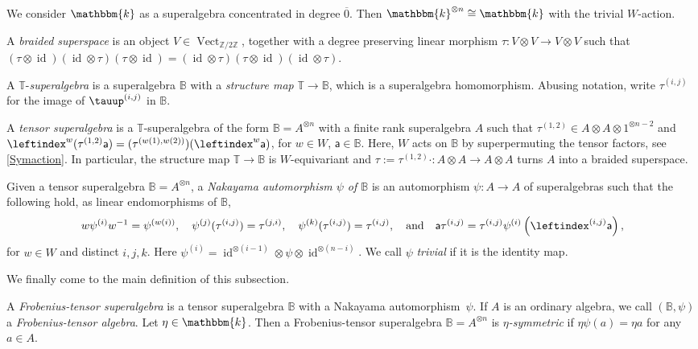 \documentclass[a4paper,11pt]{amsart}
\let\ov\overline
\numberwithin{equation}{subsection}
\theoremstyle{definition}
\theoremstyle{theorem}
\theoremstyle{remark}
\newcommand\Sym{W}
\newcommand\Ztwo{\mathbb{Z}/2\mathbb{Z}}
\newcommand\ba{\mathsf{a}}
\newcommand\op{\operatorname}
\newcommand{\ttau}{\tauup}
\newcommand\kk{\mathbbm{k}}
\newcommand\Tos{\mathbb{T}}
\newcommand{\Bo}{\mathbb{B}}
\begin{document}
We consider $\kk$ as a superalgebra concentrated in degree $\ov{0}$. Then $\kk^{\otimes n}\cong\kk$ with the trivial $\Sym$-action.
\begin{Definition}\label{D:ST-algebra}
A \emph{braided superspace} is an object $V\in\op{Vect}_{\Ztwo}$,  together with a degree preserving linear morphism $\tau\colon V\otimes V\rightarrow V\otimes V$ such that $(\tau\otimes \op{id})(\op{id}\otimes \tau)(\tau\otimes \op{id})=(\op{id}\otimes \tau)(\tau\otimes \op{id})(\op{id}\otimes \tau)$.

  A $\Tos$-\emph{superalgebra} is a superalgebra  $\Bo$ with a
  \emph{structure map} $\Tos\rightarrow\Bo$, which is a superalgebra
  homomorphism. Abusing notation, write $\tau^{(i,j)}$ for the image of $\ttau^{(i,j)}$ in $\Bo$.

 A \emph{tensor superalgebra}   is a $\Tos$-superalgebra of the form  $\Bo=A^{\otimes n}$ with a finite rank  superalgebra $A$  such that  $\tau^{(1,2)}\in A\otimes A\otimes 1^{\otimes {n-2}}$ and $\leftindex^w(\tau^{(1,2)} \ba)=(\tau^{(w(1),w(2))}) (\leftindex^w\ba)$,  for $w\in\Sym$, $\ba\in\Bo$.
  Here, $\Sym$ acts on $\Bo$ by superpermuting the tensor factors, see \autoref{Symaction}. In particular, the structure map $\Tos\rightarrow\Bo$ is $W$-equivariant and $\tau:=\tau^{(1,2)}\cdot\colon A\otimes A\rightarrow A\otimes A$  turns $A$ into a braided  superspace.
  \end{Definition}
  \begin{Definition}\label{D:Nakayama}
    Given a tensor superalgebra $\Bo=A^{\otimes n}$, a
   \emph{Nakayama automorphism $\psi$ of $\Bo$} is an automorphism
   $\psi\colon A\rightarrow A$ of superalgebras such that the following hold, as linear endomorphisms of $\Bo$,
\begin{equation}\label{Nakayama}
w\psi^{(i)}w^{-1}=\psi^{(w(i))},\quad \psi^{(j)}(\tau^{(i,j)})=\tau^{(j,i)},\quad  \psi^{(k)}(\tau^{(i,j)})=\tau^{(i,j)}, \quad  \text{and}\quad \ba\tau^{(i,j)}=\tau^{(i,j)}\psi^{(i)}\left(\leftindex^{(i,j)}\ba\right),
\end{equation}
 for $w\in\Sym$ and distinct $i,j,k$. Here  $\psi^{(i)}=\op{id}^{\otimes{(i-1)}}\otimes\psi\otimes \op{id}^{\otimes{(n-i)}}$. We call $\psi$ \emph{trivial} if it is the identity map.
 \end{Definition}
 We finally come to the main definition of this subsection.
 \begin{Definition}\label{D:Frobtensor}
  A  \emph{Frobenius-tensor superalgebra}  is a  tensor
 superalgebra $\Bo$ with a Nakayama automorphism~$\psi$.
 If $A$ is an ordinary algebra, we call  $(\Bo,\psi)$ a \emph{Frobenius-tensor algebra}.
 Let $\eta\in\kk$. Then a Frobenius-tensor superalgebra
$\Bo=A^{\otimes n}$ is \emph{$\eta$-symmetric} if $\eta\psi(a)=\eta a$
for any  $a\in A$.
\end{Definition}
\end{document}
